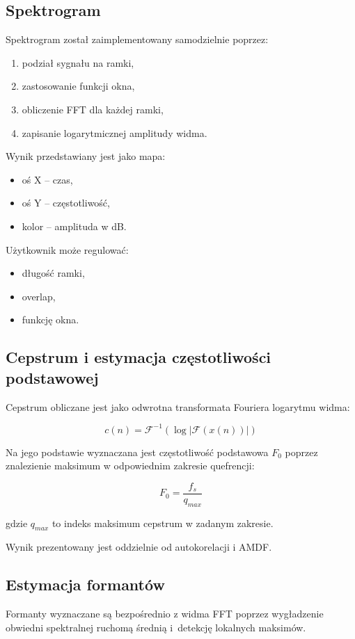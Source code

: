 \documentclass[a4paper,12pt]{article}
\begin{document}
\subsection{Spektrogram}

Spektrogram został zaimplementowany samodzielnie poprzez:

\begin{enumerate}
	\item podział sygnału na ramki,
	\item zastosowanie funkcji okna,
	\item obliczenie FFT dla każdej ramki,
	\item zapisanie logarytmicznej amplitudy widma.
\end{enumerate}

Wynik przedstawiany jest jako mapa:
\begin{itemize}
	\item oś X -- czas,
	\item oś Y -- częstotliwość,
	\item kolor -- amplituda w dB.
\end{itemize}

Użytkownik może regulować:
\begin{itemize}
	\item długość ramki,
	\item overlap,
	\item funkcję okna.
\end{itemize}

\subsection{Cepstrum i estymacja częstotliwości podstawowej}

Cepstrum obliczane jest jako odwrotna transformata Fouriera logarytmu widma:

\[
c(n) = \mathcal{F}^{-1} \left( \log |\mathcal{F}(x(n))| \right)
\]

Na jego podstawie wyznaczana jest częstotliwość podstawowa $F_0$ poprzez znalezienie maksimum w odpowiednim zakresie quefrencji:

\[
F_0 = \frac{f_s}{q_{max}}
\]

gdzie $q_{max}$ to indeks maksimum cepstrum w zadanym zakresie.



Wynik prezentowany jest oddzielnie od autokorelacji i AMDF.

\subsection{Estymacja formantów}
Formanty wyznaczane są bezpośrednio z widma FFT poprzez wygładzenie obwiedni 
spektralnej ruchomą średnią i~detekcję lokalnych maksimów.
\end{document}
